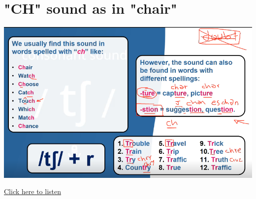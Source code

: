 \section{"CH" sound as in "chair" }
\begin{center}
\includegraphics[width=1\textwidth]{images/ch_portrait.png}
\end{center}

\href{https://drive.google.com/file/d/1iXGD0OdMNuyyw2AJ0a7Dr2jUlRgxtkmr/view?usp=drive_link}{Click here to listen}

